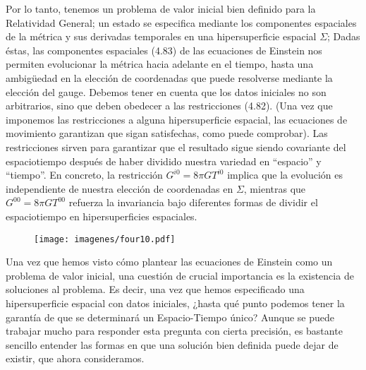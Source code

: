 \documentclass[11pt,b5paper,openany,twoside]{book}
\begin{document}
Por lo tanto, tenemos un problema de valor inicial bien definido para la Relatividad General; un estado se especifica mediante los componentes espaciales de la métrica y sus derivadas temporales en una hipersuperficie espacial $\Sigma$; Dadas éstas, las componentes espaciales (4.83) de las ecuaciones de Einstein nos permiten evolucionar la métrica hacia adelante en el tiempo, hasta una ambigüedad en la elección de coordenadas que puede resolverse mediante la elección del gauge.
Debemos tener en cuenta que los datos iniciales no son arbitrarios, sino que deben obedecer a las restricciones (4.82).
(Una vez que imponemos las restricciones a alguna hipersuperficie espacial, las ecuaciones de movimiento garantizan que sigan satisfechas, como puede comprobar).
Las restricciones sirven para garantizar que el resultado sigue siendo covariante del espaciotiempo después de haber dividido nuestra variedad en ``espacio'' y ``tiempo''. En concreto, la restricción $G^{i0}=8\pi GT^{i0}$ implica que la evolución es independiente de nuestra elección de coordenadas en $\Sigma$, mientras que $G^{00}=8\pi GT^{00}$ refuerza la invariancia bajo diferentes formas de dividir el espaciotiempo en hipersuperficies espaciales.

\begin{figure}[h]
\centering
\texttt{[image: imagenes/four10.pdf]}
\end{figure}

Una vez que hemos visto cómo plantear las ecuaciones de Einstein como un problema de valor inicial, una cuestión de crucial importancia es la existencia de soluciones al problema.
Es decir, una vez que hemos especificado una hipersuperficie espacial con datos iniciales, ¿hasta qué punto podemos tener la garantía de que se determinará un Espacio-Tiempo único? Aunque se puede trabajar mucho para responder esta pregunta con cierta precisión, es bastante sencillo entender las formas en que una solución bien definida puede dejar de existir, que ahora consideramos.
\end{document}
